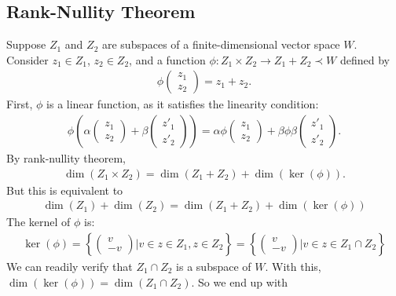 \documentclass{article}
\theoremstyle{definition}
\begin{document}
\subsection{Rank-Nullity Theorem}
Suppose $Z_1$ and $Z_2$ are subspaces of a finite-dimensional vector space $W$. Consider $z_1\in Z_1$, $z_2\in Z_2$, and a function $\phi : Z_1 \times Z_2 \to Z_1 + Z_2 \prec W$ defined by
\begin{align*}
\phi\begin{pmatrix}
z_1\\z_2
\end{pmatrix}
=
z_1 + z_2.
\end{align*}
First, $\phi$ is a linear function, as it satisfies the linearity condition:
\begin{align*}
\phi\left(\alpha
\begin{pmatrix}
z_1\\z_2
\end{pmatrix}
+
\beta\begin{pmatrix}
z'_1\\
z'_2
\end{pmatrix}\right) = \alpha\phi\begin{pmatrix}
z_1\\z_2
\end{pmatrix} + \beta \phi \beta\begin{pmatrix}
z'_1\\
z'_2
\end{pmatrix}.
\end{align*}
By rank-nullity theorem,
\begin{align*}
\dim(Z_1\times Z_2) = \dim(Z_1 + Z_2) +\dim(\ker(\phi)). 
\end{align*}
But this is equivalent to
\begin{align*}
\dim(Z_1) + \dim(Z_2) = \dim(Z_1 + Z_2) +\dim(\ker(\phi))
\end{align*}
The kernel of $\phi$ is:
\begin{align*}
\ker(\phi) = 
\left\{
\begin{pmatrix}
v\\-v
\end{pmatrix}
\bigg\vert v\in z\in Z_1, z\in Z_2
\right\}
=
\left\{
\begin{pmatrix}
v\\-v
\end{pmatrix}
\bigg\vert v\in z\in Z_1 \cap Z_2
\right\}
\end{align*}
We can readily verify that $Z_1 \cap Z_2$ is a subspace of $W$. With this, $\dim(\ker(\phi)) = \dim(Z_1\cap Z_2)$. So we end up with
\end{document}
